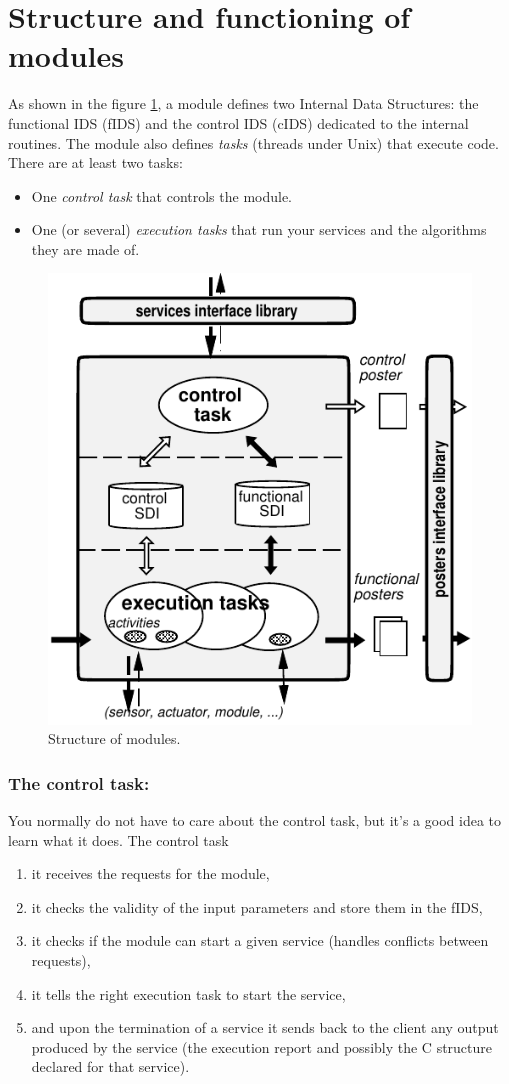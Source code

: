 
\section{Structure and functioning of modules}
\label{sec|module|module}

As shown in the figure  \ref{fig|module}, a  module defines two  Internal
Data Structures:  the functional IDS (fIDS)  and  the control  IDS (cIDS)
dedicated to the internal routines.  The module also defines \emph{tasks}
(threads under Unix) that execute code. There are at least two tasks:

\begin{itemize}
\item One \emph{control task} that controls the module.
\item One (or several) \emph{execution tasks} that run your services and
the algorithms they are made of.
\end{itemize}

\begin{figure}[htbp]
\centering
\includegraphics[width=0.5\hsize]{fig/module-en}
\caption{Structure of modules.}
\label{fig|module}
\end{figure}

\subsubsection{The control task:}

You normally do not have to care about the control task, but it's a good
idea to learn what it does. The control task

\begin{enumerate}
\item it receives the requests for the module,
\item it checks the validity of the input parameters and store them in the fIDS,
\item it checks if the module can start a given service (handles conflicts
between requests),
\item it tells the right execution task to start the service,
\item and upon the termination of a service it sends back to the client
any output produced by the service (the execution report and possibly the
C structure declared for that service).
\end{enumerate}


